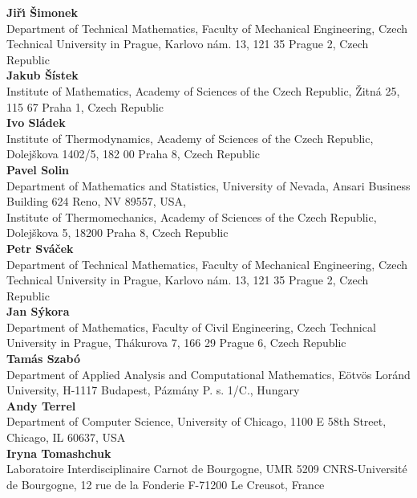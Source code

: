 \noindent
{\bf Ji\v r\'{\i} \v Simonek}\\
Department of Technical Mathematics,
Faculty of Mechanical Engineering,
Czech Technical University in Prague,
Karlovo n\'am. 13,
121 35 Prague 2,
Czech Republic\\

\noindent
{\bf Jakub \v S\'istek}\\
Institute of Mathematics,
Academy of Sciences of the Czech Republic,
\v Zitn\'a 25,
115 67 Praha 1,
Czech Republic\\

\noindent
{\bf Ivo Sl\'adek}\\
Institute of Thermodynamics,
Academy of Sciences of the Czech Republic,
Dolej\v skova 1402/5,
182 00 Praha 8,
Czech Republic\\

\noindent
{\bf Pavel Solin}\\
Department of Mathematics and Statistics,
University of Nevada,
Ansari Business Building 624
Reno, NV 89557, USA,\\
Institute of Thermomechanics, Academy of Sciences of the Czech Republic,
Dolej\v skova 5, 18200 Praha 8, Czech Republic\\

\noindent
{\bf Petr Sv\'a\v cek}\\
Department of Technical Mathematics,
Faculty of Mechanical Engineering,
Czech Technical University in Prague,
Karlovo n\'am. 13,
121 35 Prague 2,
Czech Republic\\

\noindent
{\bf Jan S\'ykora}\\
Department of Mathematics,
Faculty of Civil Engineering,
Czech Technical University in Prague,
Th\'akurova 7,
166 29 Prague 6,
Czech Republic\\

\noindent
{\bf Tam\'as Szab\'o}\\
Department of Applied Analysis and Computational Mathematics,
E\"otv\"os Lor\'and University,
H-1117 Budapest,
P{\'a}zm{\'a}ny P. s. 1/C.,
Hungary\\

\noindent
{\bf Andy Terrel}\\
Department of Computer Science,
University of Chicago,
1100 E 58th Street,
Chicago,
IL 60637,
USA\\

\noindent
{\bf Iryna Tomashchuk}\\
Laboratoire Interdisciplinaire Carnot de Bourgogne,
UMR 5209 CNRS-Universit\'{e} de Bourgogne,
12 rue de la Fonderie F-71200 Le Creusot,
France\\

